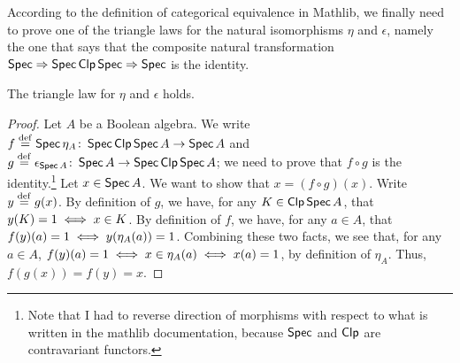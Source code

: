 \begin{remark}\leanok
According to the definition of categorical equivalence in Mathlib, we finally need to prove one
of the triangle laws for the natural isomorphisms $\eta$ and $\epsilon$, namely
the one that says that the composite natural transformation $\operatorname*{\mathsf{Spec}} \Rightarrow
\operatorname*{\mathsf{Spec}} \operatorname*{\mathsf{Clp}} \operatorname*{\mathsf{Spec}} \Rightarrow \operatorname*{\mathsf{Spec}}$ is the identity.
\end{remark}
\begin{proposition}\label{triangle}
    The triangle law for $\eta$ and $\epsilon$ holds. 
\end{proposition}
\begin{proof}
    Let $A$ be a Boolean algebra. We write $f \stackrel{\mathrm{def}}{=} \operatorname*{\mathsf{Spec}} \eta_A \colon \operatorname*{\mathsf{Spec}}
    \operatorname*{\mathsf{Clp}} \operatorname*{\mathsf{Spec}} A \to \operatorname*{\mathsf{Spec}} A$ and $g \stackrel{\mathrm{def}}{=} \epsilon_{\operatorname*{\mathsf{Spec}} A} \colon \operatorname*{\mathsf{Spec}} A
    \to \operatorname*{\mathsf{Spec}} \operatorname*{\mathsf{Clp}} \operatorname*{\mathsf{Spec}} A$; we need to prove that $f \circ g$ is the
    identity.\footnote{
        Note that I had to reverse direction of morphisms with respect to what
        is written in the mathlib documentation, because $\operatorname*{\mathsf{Spec}}$ and $\operatorname*{\mathsf{Clp}}$ are
        contravariant functors.}
    Let $x \in \operatorname*{\mathsf{Spec}} A$. We want to show that $x = (f \circ g)(x)$.  Write $y
    \stackrel{\mathrm{def}}{=} g(x)$. By definition of $g$, we have, for any $K \in \operatorname*{\mathsf{Clp}} \operatorname*{\mathsf{Spec}} A$,
    that $y(K) = 1 \iff x \in K$. By definition of $f$, we have, for any $a
    \in A$, that $f(y)(a) = 1 \iff y(\eta_A(a)) = 1$. Combining these two
    facts, we see that, for any $a \in A$, $f(y)(a) = 1 \iff x \in \eta_A(a)
    \iff x(a) = 1$, by definition of $\eta_A$. Thus, $f(g(x)) = f(y) = x$.
\end{proof}


